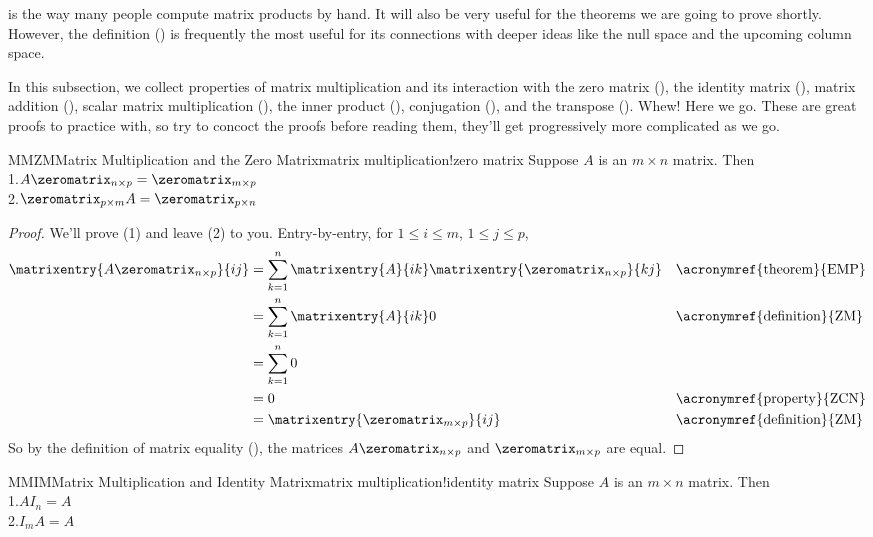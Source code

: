 %
 is the way many people compute matrix products by hand.  It will also be very useful for the theorems we are going to prove shortly.  However, the definition () is frequently the most useful for its connections with deeper ideas like the null space and the upcoming column space.\par
%
%
In this subsection, we collect properties of matrix multiplication and its interaction with
the zero matrix (),
the identity matrix (),
matrix addition (),
scalar matrix multiplication (),
the inner product (),
conjugation (),
and
the transpose ().
Whew!  Here we go.  These are great proofs to practice with, so try to concoct the proofs before reading them, they'll get progressively more complicated as we go.
%
\begin{theorem}{MMZM}{Matrix Multiplication and the Zero Matrix}{matrix multiplication!zero matrix}
Suppose $A$ is an $m\times n$ matrix.  Then\\
1.\quad  $A\zeromatrix_{n\times p}=\zeromatrix_{m\times p}$\\
2.\quad $\zeromatrix_{p\times m}A=\zeromatrix_{p\times n}$
\end{theorem}
%
\begin{proof}
We'll prove (1) and leave (2) to you.  Entry-by-entry, for $1\leq i\leq m$, $1\leq j\leq p$,
%
\begin{align*}
\matrixentry{A\zeromatrix_{n\times p}}{ij}
&=\sum_{k=1}^{n}\matrixentry{A}{ik}\matrixentry{\zeromatrix_{n\times p}}{kj}
&&\text{\acronymref{theorem}{EMP}}\\
%
&=\sum_{k=1}^{n}\matrixentry{A}{ik}0
&&\text{\acronymref{definition}{ZM}}\\
%
&=\sum_{k=1}^{n}0\\
%
&=0
&&\text{\acronymref{property}{ZCN}}\\
%
&=\matrixentry{\zeromatrix_{m\times p}}{ij}
&&\text{\acronymref{definition}{ZM}}
\end{align*}
%
So by the definition of matrix equality (), the matrices $A\zeromatrix_{n\times p}$ and $\zeromatrix_{m\times p}$ are equal.
%
\end{proof}
%
\begin{theorem}{MMIM}{Matrix Multiplication and Identity Matrix}{matrix multiplication!identity matrix}
Suppose $A$ is an $m\times n$ matrix.  Then\\
1.\quad  $AI_n=A$\\
2.\quad  $I_mA=A$
\end{theorem}
